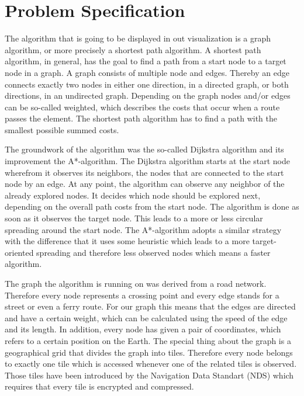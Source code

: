 \documentclass
[
	paper = a4,
    pagesize,
	12 pt,
	oneside,                       %
    open = right,
	DIV = calc,
	BCOR = 0 mm,                   %
	bibtotoc
]
{scrbook}
\begin{document}
\section{Problem Specification} \label{specification}

The algorithm that is going to be displayed in out visualization is a graph algorithm, or more precisely a shortest path algorithm.
A shortest path algorithm, in general, has the goal to find a path from a start node to a target node in a graph.
A graph consists of multiple node and edges.
Thereby an edge connects exactly two nodes in either one direction, in a directed graph, or both directions, in an undirected graph.
Depending on the graph nodes and/or edges can be so-called weighted, which describes the costs that occur when a route passes the element.
The shortest path algorithm has to find a path with the smallest possible summed costs.

\par The groundwork of the algorithm was the so-called Dijkstra algorithm and its improvement the A*-algorithm.
The Dijkstra algorithm starts at the start node wherefrom it observes its neighbors, the nodes that are connected to the start node by an edge.
At any point, the algorithm can observe any neighbor of the already explored nodes.
It decides which node should be explored next, depending on the overall path costs from the start node.
The algorithm is done as soon as it observes the target node.
This leads to a more or less circular spreading around the start node.
The A*-algorithm adopts a similar strategy with the difference that it uses some heuristic which leads to a more target-oriented spreading and therefore less observed nodes which means a faster algorithm.

\par The graph the algorithm is running on was derived from a road network.
Therefore every node represents a crossing point and every edge stands for a street or even a ferry route.
For our graph this means that the edges are directed and have a certain weight, which can be calculated using the speed of the edge and its length.
In addition, every node has given a pair of coordinates, which refers to a certain position on the Earth.
The special thing about the graph is a geographical grid that divides the graph into tiles.
Therefore every node belongs to exactly one tile which is accessed whenever one of the related tiles is observed.
Those tiles have been introduced by the Navigation Data Standart (NDS) which requires that every tile is encrypted and compressed.
\end{document}
